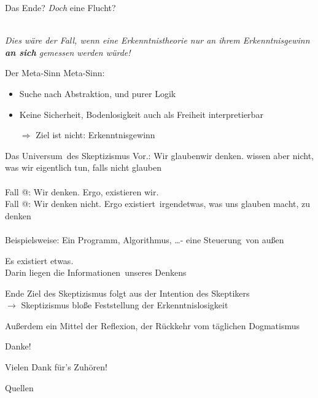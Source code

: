 \documentclass[12pt]{beamer}
\makeatletter
\newcommand*{\rom}[1]{\expandafter\@slowromancap\romannumeral #1@}
\makeatother
\begin{document}
\begin{frame}{Das Ende?}
\emph{Doch} eine Flucht?\\
\ \\
\begin{center}
\emph{Dies wäre der Fall, wenn eine Erkenntnistheorie nur an ihrem Erkenntnisgewinn \textbf{an sich} gemessen werden würde!}
\end{center}
\end{frame}

\begin{frame}{Der Meta-Sinn}
Meta-Sinn:
\begin{itemize}
\item Suche nach Abstraktion, und purer Logik
\item Keine Sicherheit, Bodenlosigkeit auch als Freiheit interpretierbar
\item[$\Rightarrow$] Ziel ist nicht: Erkenntnisgewinn
\end{itemize}
\end{frame}


\begin{frame}{Das \glqq Universum\grqq\ des Skeptizismus}
Vor.: Wir \glqq glauben\grqq wir denken. wissen aber nicht, was wir eigentlich tun, falls nicht \glqq glauben\grqq \\
\ \\
Fall \rom{1}: Wir denken. Ergo, existieren \glqq wir\grqq . \\
Fall \rom{2}: Wir denken nicht. Ergo \glqq existiert\grqq\ irgendetwas, was uns glauben macht, zu denken\\
\ \\
Beispielsweise: Ein Programm, Algorithmus, \ldots - eine \glqq Steuerung\grqq\ von \glqq außen\grqq
\end{frame}

\begin{frame}
\begin{center}
Es existiert \glqq etwas\grqq .\\
Darin liegen die \glqq Informationen\grqq\ unseres \glqq Denkens\grqq
\end{center}
\end{frame}

\begin{frame}{Ende}
Ziel des Skeptizismus folgt aus der Intention des Skeptikers\\
$\rightarrow$ Skeptizismus bloße Feststellung der Erkenntnislosigkeit\\
\begin{center}
Außerdem ein Mittel der Reflexion, der Rückkehr vom täglichen Dogmatismus
\end{center}
\end{frame}

\begin{frame}{Danke!}
\begin{center}
{\Large Vielen Dank für's Zuhören!}
\end{center}
\end{frame}

\begin{frame}[t, allowframebreaks]{Quellen}
\printbibliography
\end{frame}

%
%
%
\end{document}
